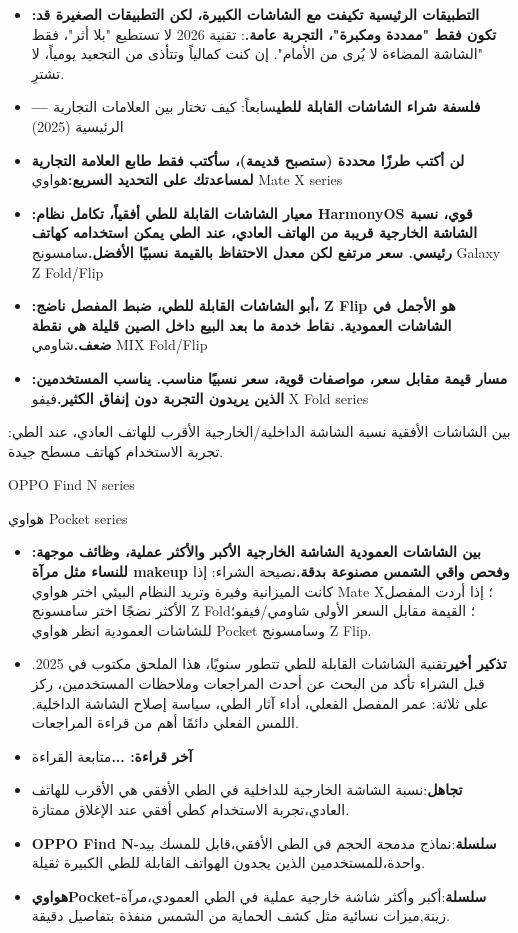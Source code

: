 \begin{itemize}
  \item \textbf{:التطبيقات الرئيسية تكيفت مع الشاشات الكبيرة، لكن التطبيقات الصغيرة قد تكون فقط "ممددة ومكبرة"، التجربة عامة.}: تقنية 2026 لا تستطيع "بلا أثر"، فقط "الشاشة المضاءة لا يُرى من الأمام". إن كنت كمالياً وتتأذى من التجعيد يومياً، لا تشترِ.
  \item \textbf{— فلسفة شراء الشاشات القابلة للطي}سابعاً: كيف تختار بين العلامات التجارية الرئيسية (2025)
  \item \textbf{لن أكتب طرزًا محددة (ستصبح قديمة)، سأكتب فقط طابع العلامة التجارية لمساعدتك على التحديد السريع:}هواوي Mate X series
  \item \textbf{:معيار الشاشات القابلة للطي أفقياً، تكامل نظام HarmonyOS قوي، نسبة الشاشة الخارجية قريبة من الهاتف العادي، عند الطي يمكن استخدامه كهاتف رئيسي. سعر مرتفع لكن معدل الاحتفاظ بالقيمة نسبيًا الأفضل.}سامسونج Galaxy Z Fold/Flip
  \item \textbf{:أبو الشاشات القابلة للطي، ضبط المفصل ناضج، Z Flip هو الأجمل في الشاشات العمودية. نقاط خدمة ما بعد البيع داخل الصين قليلة هي نقطة ضعف.}شاومي MIX Fold/Flip
  \item \textbf{:مسار قيمة مقابل سعر، مواصفات قوية، سعر نسبيًا مناسب. يناسب المستخدمين الذين يريدون التجربة دون إنفاق الكثير.}فيفو X Fold series
\end{itemize}

:بين الشاشات الأفقية نسبة الشاشة الداخلية/الخارجية الأقرب للهاتف العادي، عند الطي تجربة الاستخدام كهاتف مسطح جيدة.

OPPO Find N series


هواوي Pocket series

\begin{itemize}
  \item \textbf{:بين الشاشات العمودية الشاشة الخارجية الأكبر والأكثر عملية، وظائف موجهة للنساء مثل مرآة makeup وفحص واقي الشمس مصنوعة بدقة.}نصيحة الشراء: إذا كانت الميزانية وفيرة وتريد النظام البيئي اختر هواوي Mate X؛ إذا أردت المفصل الأكثر نضجًا اختر سامسونج Z Fold؛ القيمة مقابل السعر الأولى شاومي/فيفو؛ للشاشات العمودية انظر هواوي Pocket وسامسونج Z Flip.
  \item \textbf{تذكير أخير}تقنية الشاشات القابلة للطي تتطور سنويًا، هذا الملحق مكتوب في 2025. قبل الشراء تأكد من البحث عن أحدث المراجعات وملاحظات المستخدمين، ركز على ثلاثة: عمر المفصل الفعلي، أداء آثار الطي، سياسة إصلاح الشاشة الداخلية. اللمس الفعلي دائمًا أهم من قراءة المراجعات.
  \item \textbf{آخر قراءة: ...}متابعة القراءة
  \item \textbf{تجاهل}:نسبة الشاشة الخارجية للداخلية في الطي الأفقي هي الأقرب للهاتف العادي،تجربة الاستخدام كطي أفقي عند الإغلاق ممتازة.
  \item \textbf{OPPO Find N-سلسلة}:نماذج مدمجة الحجم في الطي الأفقي،قابل للمسك بيد واحدة،للمستخدمين الذين يجدون الهواتف القابلة للطي الكبيرة ثقيلة.
  \item \textbf{هواويPocket-سلسلة}:أكبر وأكثر شاشة خارجية عملية في الطي العمودي،مرآة زينة,ميزات نسائية مثل كشف الحماية من الشمس منفذة بتفاصيل دقيقة.
\end{itemize}


